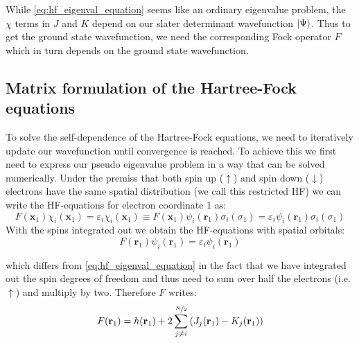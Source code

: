 While \autoref{eq:hf_eigenval_equation} seems like an ordinary eigenvalue problem, the $\chi$ terms in $J$ and $K$ depend on our slater determinant wavefunction $\ket{\Psi}$. Thus to get the ground state wavefunction, we need the corresponding Fock operator $F$ which in turn depends on the ground state wavefunction. 


\subsection{Matrix formulation of the Hartree-Fock equations}
\label{subsec:background_hf_computational}
To solve the self-dependence of the Hartree-Fock equations, we need to iteratively update our wavefunction until convergence is reached. To achieve this we first need to express our pseudo eigenvalue problem in a way that can be solved numerically. Under the premiss that both spin up ($\uparrow$) and spin down ($\downarrow$) electrons have the same spatial distribution (we call this restricted HF) we can write the HF-equations for electron coordinate 1 as:
\begin{equation}
    F(\mathbf{x}_1) \chi_i(\mathbf{x}_1) = \varepsilon_i \chi_i(\mathbf{x}_1) \equiv F(\mathbf{x}_1) \psi_i(\mathbf{r}_1) \sigma_i(\sigma_1) = \varepsilon_i \psi_i(\mathbf{r}_1) \sigma_i(\sigma_1)
\end{equation}
With the spins integrated out we obtain the HF-equations with spatial orbitals: 
\begin{equation}
    \label{eq:hf_eigenval_equation_spatial}
    F(\mathbf{r}_1) \psi_i(\mathbf{r}_1) = \varepsilon_i \psi_i(\mathbf{r}_1)
\end{equation}

which differs from \autoref{eq:hf_eigenval_equation} in the fact that we have integrated out the spin degrees of freedom and thus need to sum over half the electrons (i.e. $\uparrow$) and multiply by two. Therefore $F$ writes:
\begin{equation}
    \label{eq:fock_operator_spatial}
    F(\mathbf{r}_1) = h(\mathbf{r}_1) + 2 \sum_{j\neq i}^{\nicefrac{N}{2}} \left( J_j(\mathbf{r}_1) - K_j(\mathbf{r}_1) \right)
\end{equation}

